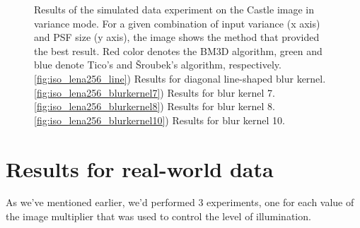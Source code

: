 \documentclass[12pt,notitlepage]{report}
\begin{document}
\begin{figure}[h]
  \caption[Simulated-data experiment on the Castle image in variance mode]{Results of the simulated data experiment on the Castle image in variance mode. For a given combination of input variance (x axis) and PSF size (y axis), the image shows the method that provided the best result. Red color denotes the BM3D algorithm, green and blue denote Tico's and Šroubek's algorithm, respectively. \ref{fig:iso_lena256_line}) Results for diagonal line-shaped blur kernel. \ref{fig:iso_lena256_blurkernel7}) Results for blur kernel 7. \ref{fig:iso_lena256_blurkernel8}) Results for blur kernel 8. \ref{fig:iso_lena256_blurkernel10}) Results for blur kernel 10.} 
  \label{fig:var_castle256}
\end{figure}

\clearpage

\section{Results for real-world data}
\label{sec:real_world_data}

As we've mentioned earlier, we'd performed 3 experiments, one for each value of the image multiplier that was used to control the level of illumination.   
\end{document}
